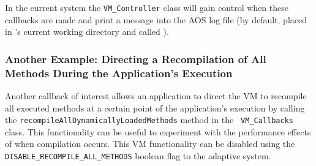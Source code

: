 In the current system the {\tt VM\_Controller} class will gain control
when these callbacks are made and print a message into the 
AOS log
file (by default, placed in \jrvm{}'s current working directory and called ).

\subsubsection{Another Example: Directing a Recompilation of All
Methods  During the Application's Execution
}\label{sssec:callback-example2}
Another callback of interest allows an application to direct the VM
to recompile all executed methods at a certain point of the
application's execution by calling the 
{\tt recompileAllDynamicallyLoadedMethods} method in the {\tt
VM\_Callbacks} class.
This functionality can be useful to experiment with the
performance effects of when compilation occurs.  This VM functionality can be
disabled using the {\tt DISABLE\_RECOMPILE\_ALL\_METHODS} boolean flag
to the adaptive system. 



